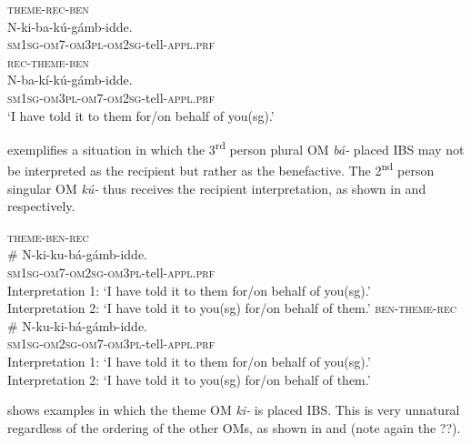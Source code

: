 \documentclass[output=paper,
            colorlinks, citecolor=brown
            ,draftmode
		  ]{langscibook}
\begin{document}
\ea%
    \label{ex:yoneda:50}
    \ea\label{ex:yoneda:50a}\textsc{theme}-\textsc{rec-ben}\\
    \gll N-ki-ba-kú-gámb-idde.\\
         \textsc{sm1sg-om7-om3pl-om2sg}-tell-\textsc{appl.prf}\\
    \ex\label{ex:yoneda:50b} \textsc{rec}-\textsc{theme}-\textsc{ben}\\
    \gll N-ba-kí-kú-gámb-idde.\\
    \textsc{sm1sg-om3pl-om7-om2sg}-tell-\textsc{appl.prf}\\
    \glt ‘I have told it to them for/on behalf of you(sg).’
    \z
\z


 exemplifies a situation in which the 3\textsuperscript{rd} person plural OM \textit{bá-} placed IBS may not be interpreted as the recipient but rather as the benefactive. The 2\textsuperscript{nd} person singular OM \textit{kú-} thus receives the recipient interpretation, as shown in  and  respectively.  


\ea%
    \label{ex:yoneda:51}
    \ea\label{ex:yoneda:51a}\textsc{theme}-\textsc{ben-rec}\\
    \gll \# N-ki-ku-bá-gámb-idde.\\
        {} \textsc{sm1sg-om7-om2sg-om3pl}-tell-\textsc{appl.prf} \\
    \glt *Interpretation 1:  ‘I have told it to them for/on behalf of you(sg).’  \\
Interpretation 2:   ‘I have told it to you(sg) for/on behalf of them.’
    \ex\label{ex:yoneda:51b} \textsc{ben}-\textsc{theme}-\textsc{rec}\\
    \gll \# N-ku-ki-bá-gámb-idde.      \\
      {} \textsc{sm1sg-om2sg-om7-om3pl}-tell-\textsc{appl.prf}\\              
      \glt  *Interpretation 1:  ‘I have told it to them for/on behalf of you(sg).’       \\
    Interpretation 2:   ‘I have told it to you(sg) for/on behalf of them.’
    \z
\z


 shows examples in which the theme OM \textit{ki-} is placed IBS. This is very unnatural regardless of the ordering of the other OMs, as shown in  and  (note again the ??).   
\end{document}
